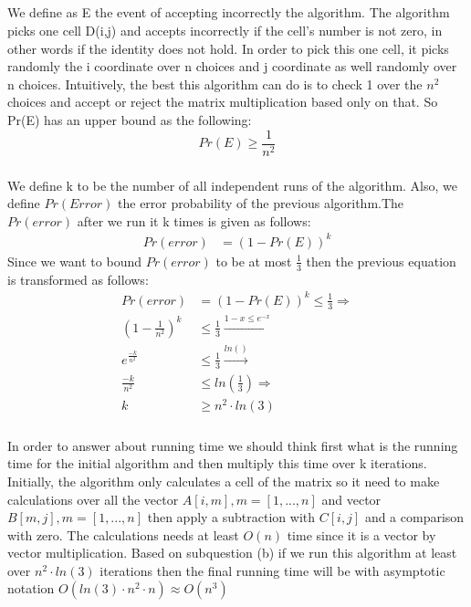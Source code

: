\documentclass[11pt]{537homework}
\begin{document}
\subsection{}
\subsubsection{}

We define as E the event of accepting incorrectly the algorithm. 
The algorithm picks one cell D(i,j) and accepts incorrectly if the cell's number is not zero, in other words if the identity does not hold. In order to pick this one cell, it picks randomly the i coordinate over n choices and j coordinate as well randomly over n choices. Intuitively, the best this algorithm can do is to check 1 over the $n^2$ choices and accept or reject the matrix multiplication based only on that. So Pr(E) has an upper bound as the following:
\begin{equation*}
  Pr(E) \geq \frac{1}{n^2} 
\end{equation*} 

\subsubsection{}
We define k to be the number of all independent runs of the algorithm. Also, we define $Pr(Error)$ the error probability of the previous algorithm.The $Pr(error)$ after we run it k times is given as follows:
\begingroup
\allowdisplaybreaks
\begin{align*}
  Pr(error) &= (1 - Pr(E))^k 
\end{align*}
\endgroup
Since we want to bound $Pr(error)$ to be at most $\frac{1}{3}$ then the previous equation is transformed as follows:\\
\begingroup
\allowdisplaybreaks
\begin{align*}
  Pr(error) &= (1 - Pr(E))^k \leq \frac{1}{3} \Longrightarrow \\
  (1 - \frac{1}{n^2})^k &\leq \frac{1}{3} \xrightarrow{1-x \leq e^{-x}}\\
  e^{\frac{-k}{n^2}} &\leq \frac{1}{3} \xrightarrow{ln()}\\
  \frac{-k}{n^2} &\leq ln(\frac{1}{3}) \Longrightarrow \\
  k &\geq n^2 \cdot ln(3)
\end{align*}
\endgroup
\subsubsection{}
In order to answer about running time we should think first what is the running time for the initial algorithm and then multiply this time over k iterations. Initially, the algorithm only calculates a cell of the matrix so it need to make calculations over all the vector $A[i,m] ,m = [1,...,n]$ and vector $B[m,j], m=[1,...,n]$ then apply a subtraction with $C[i,j]$ and a comparison with zero. The calculations needs at least $O(n)$ time since it is a vector by vector multiplication. Based on subquestion (b) if we run this algorithm at least over $n^2 \cdot ln(3)$ iterations then the final running time will be with asymptotic notation $O(ln(3) \cdot n^{2}\cdot n) \approx O(n^3)$
\end{document}
